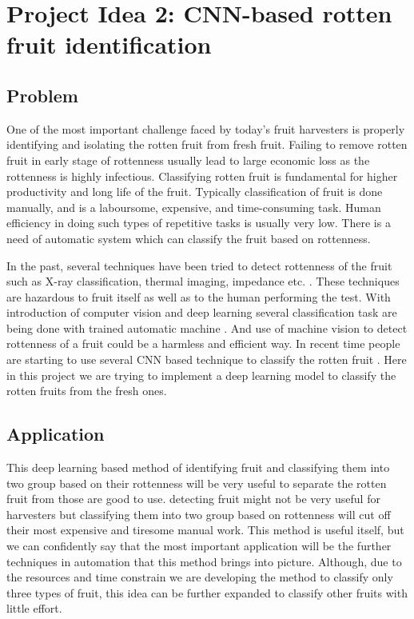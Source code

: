 \documentclass{report}
\begin{document}
\section{Project Idea 2: CNN-based rotten fruit identification}
\subsection{Problem}
One of the most important challenge faced by today's fruit harvesters is properly identifying and isolating the rotten fruit from fresh fruit.  Failing to remove rotten fruit in early stage of rottenness usually lead to large economic loss as the rottenness is highly infectious.  Classifying rotten fruit is fundamental for higher productivity and long life of the fruit. Typically classification of fruit is done manually, and is a laboursome, expensive, and time-consuming task. Human efficiency in doing such types of repetitive tasks is usually very low. There is a need of automatic system which can classify the fruit based on rottenness. \par
 In the past, several techniques have been tried to detect rottenness of the fruit such as X-ray classification, thermal imaging, impedance etc. \cite{rotten1}. These techniques are hazardous to fruit itself as well as to the human performing the test. With introduction of computer vision and deep learning several classification task are being done with trained automatic machine \cite{rotten2}. And use of machine vision to detect rottenness of a fruit could be a harmless and efficient way. In recent time people are starting to use several CNN based technique to classify the rotten fruit \cite{rotten3}. Here in this project we are trying to implement a deep learning model to classify the rotten fruits from the fresh ones.\par
 \subsection{Application}
 This deep learning based method of identifying fruit and classifying them into two group based on their rottenness will be very useful to separate the rotten fruit from those are good to use. detecting fruit might not be very useful for harvesters but classifying them into two group based on rottenness will cut off their most expensive and tiresome manual work. This method is useful itself, but we can confidently say that the most important application will be the further techniques in automation that this method brings into picture. Although, due to the resources and time constrain we are developing the method to classify only three types of fruit, this idea can be further expanded to classify other fruits with little effort.

\end{document}
